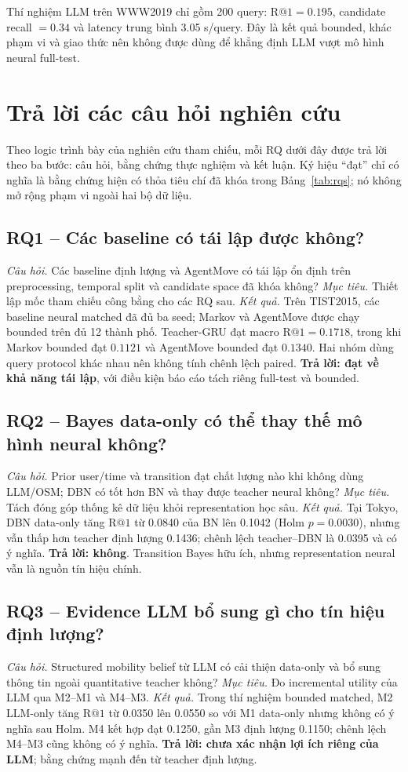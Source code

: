 \documentclass[runningheads]{llncs}
\makeatletter
\newcommand{\Rone}{\mathrm{R@1}}
\makeatother
\begin{document}
Thí nghiệm LLM trên WWW2019 chỉ gồm 200 query: $\Rone=0.195$, candidate recall $=0.34$ và latency trung bình 3.05 s/query. Đây là kết quả bounded, khác phạm vi và giao thức nên không được dùng để khẳng định LLM vượt mô hình neural full-test.

\section{Trả lời các câu hỏi nghiên cứu}

Theo logic trình bày của nghiên cứu tham chiếu, mỗi RQ dưới đây được trả lời theo ba bước:
câu hỏi, bằng chứng thực nghiệm và kết luận. Ký hiệu ``đạt'' chỉ có nghĩa là bằng chứng hiện có
thỏa tiêu chí đã khóa trong Bảng~\ref{tab:rqs}; nó không mở rộng phạm vi ngoài hai bộ dữ liệu.

\subsection{RQ1 -- Các baseline có tái lập được không?}
\textit{Câu hỏi.} Các baseline định lượng và AgentMove có tái lập ổn định trên preprocessing,
temporal split và candidate space đã khóa không?
\textit{Mục tiêu.} Thiết lập mốc tham chiếu công bằng cho các RQ sau.
\textit{Kết quả.} Trên TIST2015, các baseline neural matched đã đủ ba seed; Markov và AgentMove được chạy
bounded trên đủ 12 thành phố. Teacher-GRU đạt macro $\Rone=0.1718$, trong khi Markov
bounded đạt $0.1121$ và AgentMove bounded đạt $0.1340$. Hai nhóm dùng query protocol khác
nhau nên không tính chênh lệch paired. \textbf{Trả lời: đạt về khả năng tái lập}, với điều kiện
báo cáo tách riêng full-test và bounded.

\subsection{RQ2 -- Bayes data-only có thể thay thế mô hình neural không?}
\textit{Câu hỏi.} Prior user/time và transition đạt chất lượng nào khi không dùng LLM/OSM;
DBN có tốt hơn BN và thay được teacher neural không?
\textit{Mục tiêu.} Tách đóng góp thống kê dữ liệu khỏi representation học sâu.
\textit{Kết quả.} Tại Tokyo, DBN data-only tăng $\Rone$ từ 0.0840 của BN lên 0.1042
(Holm $p=0.0030$), nhưng vẫn thấp hơn teacher định lượng 0.1436; chênh lệch teacher--DBN
là 0.0395 và có ý nghĩa. \textbf{Trả lời: không}. Transition Bayes hữu ích, nhưng representation
neural vẫn là nguồn tín hiệu chính.

\subsection{RQ3 -- Evidence LLM bổ sung gì cho tín hiệu định lượng?}
\textit{Câu hỏi.} Structured mobility belief từ LLM có cải thiện data-only và bổ sung thông tin
ngoài quantitative teacher không?
\textit{Mục tiêu.} Đo incremental utility của LLM qua M2--M1 và M4--M3.
\textit{Kết quả.} Trong thí nghiệm bounded matched, M2 LLM-only tăng $\Rone$ từ 0.0350 lên 0.0550 so với
M1 data-only nhưng không có ý nghĩa sau Holm. M4 kết hợp đạt 0.1250, gần M3 định lượng
0.1150; chênh lệch M4--M3 cũng không có ý nghĩa. \textbf{Trả lời: chưa xác nhận lợi ích riêng
của LLM}; bằng chứng mạnh đến từ teacher định lượng.
\end{document}
